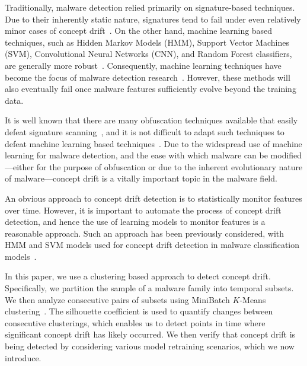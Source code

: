 \documentclass[12pt]{article}
\begin{document}
Traditionally, malware detection relied primarily on signature-based techniques.
Due to their inherently static nature, signatures
tend to fail under even relatively minor cases of concept drift~\cite{Alejandro}.
On the other hand,
machine learning based techniques, such as Hidden Markov Models (HMM), 
Support Vector Machines (SVM), 
Convolutional Neural Networks (CNN), and Random Forest classifiers, are generally
more robust~\cite{Anupama2022}. 
Consequently, machine learning techniques
have become the focus of malware detection research~\cite{Gibert}. 
However, these methods will also eventually fail 
once malware features sufficiently evolve beyond the training data.

It is well known that there are many obfuscation techniques
available that easily defeat signature scanning~\cite{bm},
and it is not difficult to adapt such techniques to 
defeat machine learning based techniques~\cite{Lin}.
Due to the widespread use of machine learning for malware detection,
and the ease with which malware can be modified---either for
the purpose of obfuscation or due to the 
inherent evolutionary nature of malware---concept drift is a
vitally important topic in the malware field. 

An obvious approach to concept drift detection is to statistically monitor features over time. 
However, it is important to automate the process of concept drift detection, and hence the use
of learning models to monitor features is a reasonable approach. Such an
approach has been previously considered, with HMM and SVM models used for concept 
drift detection in malware classification models~\cite{Sunhera,Lolitha,Mayuri}.

In this paper, we use a clustering based approach to detect concept drift.  
Specifically, we partition the sample of a malware family into
temporal subsets. We then analyze consecutive pairs of subsets using 
MiniBatch $K$-Means clustering~\cite{scikit-learn_mini_batch_kmeans}. 
The silhouette coefficient is used to quantify changes between consecutive clusterings, 
which enables us to detect points in time where significant concept drift has likely occurred.
We then verify that concept drift is being detected by considering various 
model retraining scenarios, which we now introduce.
\end{document}
